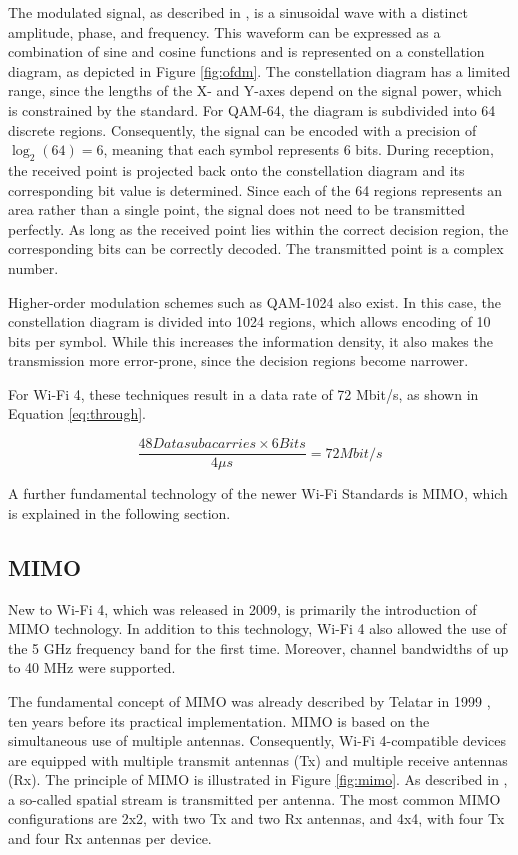 The modulated signal, as described in \cite[p. 2,3]{CHEN20181}, is a sinusoidal wave with a distinct amplitude, phase, and frequency.
This waveform can be expressed as a combination of sine and cosine functions and is represented on a constellation diagram, as depicted in Figure \ref{fig:ofdm}.
The constellation diagram has a limited range, since the lengths of the X- and Y-axes depend on the signal power, which is constrained by the standard.
For \ac{QAM}-64, the diagram is subdivided into 64 discrete regions.
Consequently, the signal can be encoded with a precision of $\log_2(64) = 6$, meaning that each symbol represents 6 bits.
During reception, the received point is projected back onto the constellation diagram and its corresponding bit value is determined.
Since each of the 64 regions represents an area rather than a single point, the signal does not need to be transmitted perfectly.
As long as the received point lies within the correct decision region, the corresponding bits can be correctly decoded.
The transmitted point is a complex number.

Higher-order modulation schemes such as \ac{QAM}-1024 also exist.
In this case, the constellation diagram is divided into 1024 regions, which allows encoding of 10 bits per symbol.
While this increases the information density, it also makes the transmission more error-prone, since the decision regions become narrower.

For Wi-Fi 4, these techniques result in a data rate of 72 Mbit/s, as shown in Equation \ref{eq:through}.

\begin{equation} \label{eq:through}
\frac{48 Datasubacarries \times 6 Bits}{4 \mu s} = 72 Mbit/s
\end{equation}

A further fundamental technology of the newer Wi-Fi Standards is \ac{MIMO}, which is explained in the following section.

\subsection{MIMO}
New to Wi-Fi 4, which was released in 2009, is primarily the introduction of \ac{MIMO} technology.
In addition to this technology, Wi-Fi 4 also allowed the use of the 5 GHz frequency band for the first time.
Moreover, channel bandwidths of up to 40 MHz were supported.

The fundamental concept of \ac{MIMO} was already described by Telatar in 1999 \cite{telatar1999capacity}, ten years before its practical implementation.
\ac{MIMO} is based on the simultaneous use of multiple antennas.
Consequently, Wi-Fi 4-compatible devices are equipped with multiple transmit antennas (Tx) and multiple receive antennas (Rx).
The principle of \ac{MIMO} is illustrated in Figure \ref{fig:mimo}.
As described in \cite[p. 2]{4699969}, a so-called spatial stream is transmitted per antenna.
The most common \ac{MIMO} configurations are 2x2, with two Tx and two Rx antennas, and 4x4, with four Tx and four Rx antennas per device.


